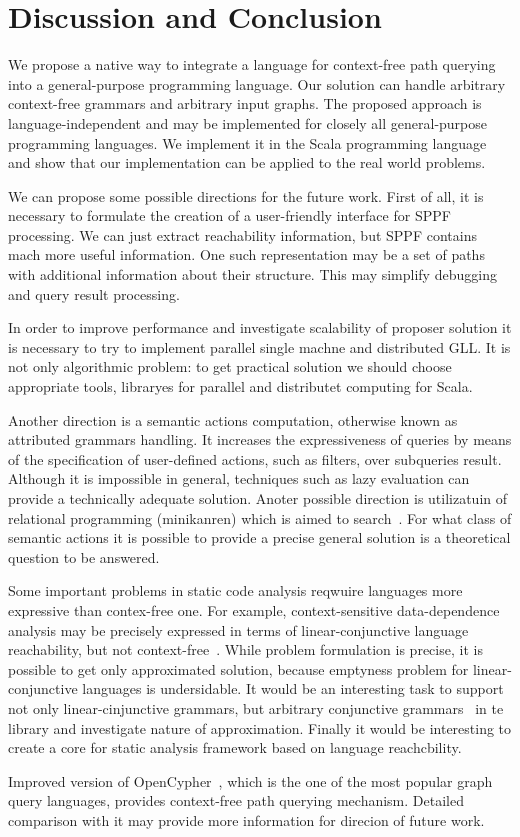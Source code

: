 \section{Discussion and Conclusion}
\label{sec:conclusion}

We propose a native way to integrate a language for context-free path querying into a general-purpose programming language.
Our solution can handle arbitrary context-free grammars and arbitrary input graphs.
The proposed approach is language-independent and may be implemented for closely all general-purpose programming languages.
We implement it in the Scala programming language and show that our implementation can be applied to the real world problems.

We can propose some possible directions for the future work.
First of all, it is necessary to formulate the creation of a user-friendly interface for SPPF processing.
We can just extract reachability information, but SPPF contains mach more useful information.
One such representation may be a set of paths with additional information about their structure.
This may simplify debugging and query result processing.

In order to improve performance and investigate scalability of proposer solution it is necessary to try to implement parallel single machne and distributed GLL.
It is not only algorithmic problem: to get practical solution we should choose appropriate tools, libraryes for parallel and distributet computing for Scala.

Another direction is a semantic actions computation, otherwise known as attributed grammars handling.
It increases the expressiveness of queries by means of the specification of user-defined actions, such as filters, over subqueries result. 
Although it is impossible in general, techniques such as lazy evaluation can provide a technically adequate solution.
Anoter possible direction is utilizatuin of relational programming (minikanren) which is aimed to search~\cite{DB}.
For what class of semantic actions it is possible to provide a precise general solution is a theoretical question to be answered. 

Some important problems in static code analysis reqwuire languages more expressive than contex-free one.
For example, context-sensitive data-dependence analysis may be precisely expressed in terms of linear-conjunctive language~\cite{Okhotin2003LCL} reachability, but not context-free~\cite{LCLReachability}.
While problem formulation is precise, it is possible to get only approximated solution, because emptyness problem for linear-conjunctive languages is undersidable.
It would be an interesting task to support not only linear-cinjunctive grammars, but arbitrary conjunctive grammars~\cite{okhotin2001conjunctive} in te library and investigate nature of approximation.
Finally it would be interesting to create a core for static analysis framework based on language reachcbility.

Improved version of OpenCypher~\cite{OpenCypherPR}, which is the one of the most popular graph query languages, provides context-free path querying mechanism.
Detailed comparison with it may provide more information for direcion of future work.
